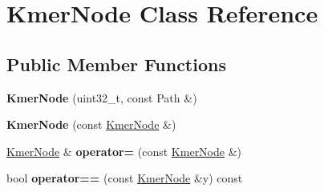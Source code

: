 \hypertarget{classKmerNode}{}\section{Kmer\+Node Class Reference}
\label{classKmerNode}
\subsection*{Public Member Functions}
\begin{DoxyCompactItemize}
\item 
\mbox{\label{classKmerNode_a38883c14c1c6bfffc357fb273934c009}} 
{\bfseries Kmer\+Node} (uint32\+\_\+t, const Path \&)
\item 
\mbox{\label{classKmerNode_a5cc56ae17814f76240ed526cc17437c3}} 
{\bfseries Kmer\+Node} (const \hyperlink{classKmerNode}{Kmer\+Node} \&)
\item 
\mbox{\label{classKmerNode_a3212f4d9906976461986d0e920ac3830}} 
\hyperlink{classKmerNode}{Kmer\+Node} \& {\bfseries operator=} (const \hyperlink{classKmerNode}{Kmer\+Node} \&)
\item 
\mbox{\label{classKmerNode_ab7f918bd3410f5d2f2bb4d8c0530df0f}} 
bool {\bfseries operator==} (const \hyperlink{classKmerNode}{Kmer\+Node} \&y) const
\end{DoxyCompactItemize}
